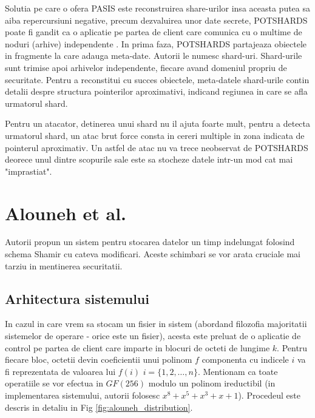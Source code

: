 \documentclass{llncs}
\begin{document}
Solutia pe care o ofera PASIS este reconstruirea share-urilor insa aceasta putea sa aiba repercursiuni negative, precum dezvaluirea unor date secrete,
POTSHARDS poate fi gandit ca o aplicatie pe partea de client care comunica cu o multime de noduri (arhive) independente . In prima faza, POTSHARDS partajeaza obiectele in fragmente la care adauga meta-date. Autorii le numesc shard-uri. Shard-urile sunt trimise apoi arhivelor independente, fiecare avand domeniul propriu de securitate. Pentru a reconstitui cu succes obiectele, meta-datele shard-urile contin detalii despre structura pointerilor aproximativi, indicand regiunea in care se afla urmatorul shard.

Pentru un atacator, detinerea unui shard nu il ajuta foarte mult, pentru a detecta urmatorul shard, un atac brut force consta in cereri multiple in zona indicata de pointerul aproximativ. Un astfel de atac nu va trece neobservat de POTSHARDS deorece unul dintre scopurile sale este sa stocheze datele intr-un mod cat mai "imprastiat".\cite{SGMV:2009}

\section{Alouneh et al.}
\label{desc_alouneh}

Autorii propun un sistem pentru stocarea datelor un timp indelungat folosind schema Shamir cu cateva modificari. Aceste schimbari se vor arata cruciale mai tarziu in mentinerea securitatii.

\subsection{Arhitectura sistemului}
In cazul in care vrem sa stocam un fisier in sistem (abordand filozofia majoritatii sistemelor de operare - orice este un fisier), acesta este preluat de o aplicatie de control pe partea de client care imparte in blocuri de octeti de lungime $k$. Pentru fiecare bloc, octetii devin coeficientii unui polinom $f$ componenta cu indicele $i$ va fi reprezentata de valoarea lui $f(i)$ $i = \{1,2,\dots, n\}$. Mentionam ca toate operatiile se vor efectua in $GF(256)$ modulo un polinom ireductibil (in implementarea sistemului, autorii folosesc $x^8 + x^5 + x^3 + x + 1$). Procedeul este descris in detaliu in Fig \ref{fig:alouneh_distribution}.
\end{document}
